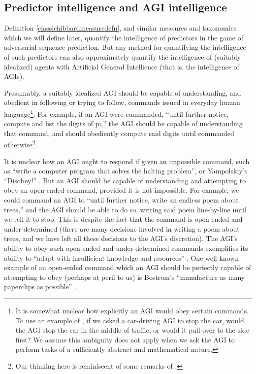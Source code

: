 \documentclass[twoside,11pt]{article}
\begin{document}
\subsection{Predictor intelligence and AGI intelligence}
\label{agiproxysection}

Definition \ref{classichibbardmeasuredefn}, and similar measures and taxonomies
which we will
define later, quantify the intelligence of predictors in the game of
adversarial sequence prediction.
But any method for quantifying the intelligence of such predictors can also
approximately quantify the intelligence of (suitably idealized)
agents with Artificial General Intellience (that is, the intelligence of AGIs).

Presumably, a suitably idealized AGI should be capable of understanding, and
obedient in following or trying to follow, commands issued in everyday human
language\footnote{It is somewhat unclear how explicitly an AGI would
obey certain commands. To use an example of
\citet{yampolskiycontrol}, if we asked a car-driving AGI
to stop the car, would the AGI stop the car
in the middle of traffic, or would it pull over to the side first?
We assume this ambiguity does not apply when we ask the AGI to perform
tasks of a sufficiently abstract and mathematical nature.}.
For example, if an AGI were commanded, ``until further notice, compute and list the
digits of pi,'' the AGI should be capable of understanding that command, and should
obediently compute said digits until commanded otherwise\footnote{Our thinking
here is reminiscent of some remarks of \citet{yampolskiy2013turing}.}.

It is unclear how an AGI ought to respond if given an impossible command,
such as ``write a computer program
that solves the halting problem'', or Yampolskiy's
``Disobey!'' \citep{yampolskiycontrol}. But an AGI should be capable of
understanding and attempting to obey an open-ended command, provided it is not
impossible. For example, we could command an AGI to ``until further notice,
write an endless poem about trees,'' and the AGI should be able to do so, writing
said poem line-by-line until we tell it to stop. This is despite the fact that the
command is open-ended and under-determined
(there are many decisions involved in writing a
poem about trees, and we have left all these decisions to the AGI's discretion).
The AGI's ability to obey such open-ended and under-determined commands
exemplifies its
ability to ``adapt with insufficient
knowledge and resources'' \citep{wang2019defining}.
One well-known example of an open-ended command which an AGI should be perfectly
capable of attempting to obey (perhaps at peril to us) is
Bostrom's ``manufacture as many paperclips as possible'' \citep{bostrom2003ethical}.
\end{document}

